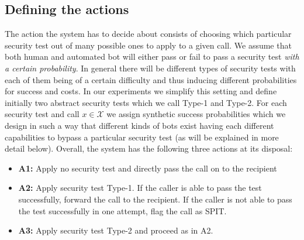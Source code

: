 \documentclass{llncs}
\begin{document}
\subsection{Defining the actions}
The action the system has to decide about consists of choosing which particular
security test out of many possible ones to apply to a given call.  
We assume that both human and automated bot will either pass or fail to pass a security test {\em with a certain probability}. 
In general there will be different types of security
tests with each of them being of a certain difficulty and thus inducing different 
probabilities for success and costs. In our experiments we simplify this setting and define
initially two abstract security tests which we call Type-1 and Type-2. For each security test
and call $x \in \mathcal X$ we assign synthetic success probabilities which we design in such
a way that different kinds of bots exist having each different capabilities to bypass
a particular security test (as will be explained in more detail below).
Overall, the system has the following three actions at its disposal:
\begin{itemize}
\item {\bf A1:} Apply no security test and directly pass the call on to the recipient

\item {\bf A2:} Apply security test Type-1. If the caller is able to pass the test
successfully, forward the call to the recipient. If the caller is not able to pass 
the test successfully in one attempt, flag the call as SPIT.

\item{\bf A3:} Apply security test Type-2 and proceed as in A2.
\end{itemize}
\end{document}
